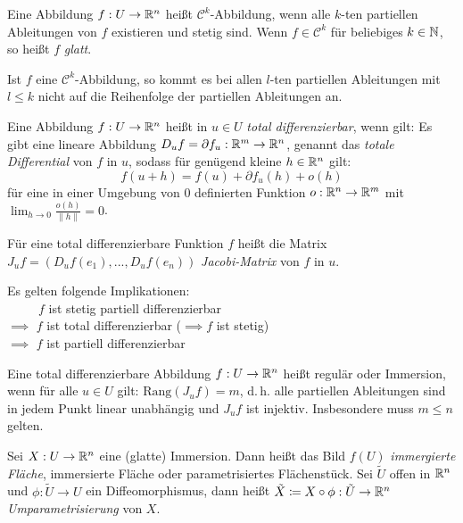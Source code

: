 \documentclass{cheat-sheet}
\begin{document}
\begin{defn}
  Eine Abbildung $f : U \to \mathbb{R}^n$ heißt $\mathcal{C}^k$-Abbildung, wenn alle $k$-ten partiellen Ableitungen von $f$ existieren und stetig sind. Wenn $f \in \mathcal{C}^k$ für beliebiges $k \in \mathbb{N}$, so heißt $f$ \emph{glatt}.
\end{defn}

\begin{satz}[Schwarz]
  Ist $f$ eine $\mathcal{C}^k$-Abbildung, so kommt es bei allen $l$-ten partiellen Ableitungen mit $l \leq k$ nicht auf die Reihenfolge der partiellen Ableitungen an.
\end{satz}

\begin{defn}
  Eine Abbildung $f : U \to \mathbb{R}^n$ heißt in $u \in U$ \emph{total differenzierbar}, wenn gilt: Es gibt eine lineare Abbildung $D_u f = \partial f_u : \mathbb{R}^m \to \mathbb{R}^n$, genannt das \emph{totale Differential} von $f$ in $u$, sodass für genügend kleine $h \in \mathbb{R}^n$ gilt:
  \[ f(u + h) = f(u) + \partial f_u(h) + o(h) \]
  für eine in einer Umgebung von $0$ definierten Funktion $o : \mathbb{R}^n \to \mathbb{R}^m$ mit $\lim_{h \to 0} \tfrac{o(h)}{\| h \|} = 0$.
\end{defn}

\begin{defn}
  Für eine total differenzierbare Funktion $f$ heißt die Matrix $J_u f = (D_u f(e_1), ..., D_u f(e_n))$ \emph{Jacobi-Matrix} von $f$ in $u$.
\end{defn}

\begin{bem}
Es gelten folgende Implikationen:\\
$\quad\quad\,\,\, f$ ist stetig partiell differenzierbar\\
$\implies$ $f$ ist total differenzierbar ($\!\implies f$ ist stetig)\\
$\implies$ $f$ ist partiell differenzierbar
\end{bem}


\begin{defn}
  Eine total differenzierbare Abbildung $f : U \to \mathbb{R}^n$ heißt regulär oder Immersion, wenn für alle $u \in U$ gilt: $\mathrm{Rang}(J_u f) = m$, d.\,h. alle partiellen Ableitungen sind in jedem Punkt linear unabhängig und $J_u f$ ist injektiv. Insbesondere muss $m \leq n$ gelten.
\end{defn}

\begin{defn}
  Sei $X : U \to \mathbb{R}^n$ eine (glatte) Immersion. Dann heißt das Bild $f(U)$ \emph{immergierte Fläche}, immersierte Fläche oder parametrisiertes Flächenstück. Sei $\tilde{U}$ offen in $\mathbb{R}^n$ und $\phi : \tilde{U} \to U$ ein Diffeomorphismus, dann heißt $\tilde{X} \coloneqq X \circ \phi : \tilde{U} \to \mathbb{R}^n$ \emph{Umparametrisierung} von $X$.
\end{defn}
\end{document}
